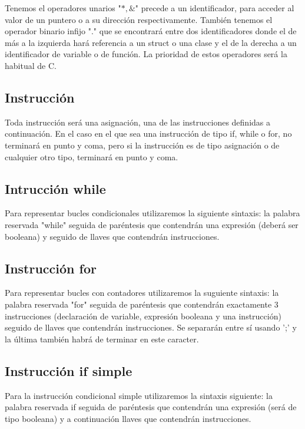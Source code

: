 \documentclass{article}
\begin{document}
Tenemos el operadores unarios "$*,\&$" precede a un identificador, para acceder al valor de un puntero o a su dirección respectivamente.
También tenemos el operador binario infijo "." que se encontrará entre dos identificadores donde el de más a la izquierda hará referencia a un struct o una clase y el de la derecha a un identificador de variable o de función. La prioridad de estos operadores será la habitual de C.


\subsection{Instrucción}
Toda instrucción será una asignación, una de las instrucciones definidas a continuación. En el caso en el que sea una instrucción de tipo if, while o for, no terminará en punto y coma, pero si la instrucción es de tipo asignación o de cualquier otro tipo, terminará en punto y coma.


\subsection{Intrucción while}

Para representar bucles condicionales utilizaremos la siguiente sintaxis: la palabra reservada "while" seguida de paréntesis que contendrán una expresión (deberá ser booleana) y seguido de llaves que contendrán instrucciones.

\subsection{Instrucción for}

Para representar bucles con contadores utilizaremos la suguiente sintaxis: la palabra reservada "for" seguida de paréntesis que contendrán exactamente 3 instrucciones (declaración de variable, expresión booleana y una instrucción) seguido de llaves que contendrán instrucciones. Se separarán entre sí usando ';' y la última también habrá de terminar en este caracter.

\subsection{Instrucción if simple}

Para la instrucción condicional simple utilizaremos la sintaxis siguiente: la palabra reservada if seguida de paréntesis que contendrán una expresión (será de tipo booleana) y a continuación llaves que contendrán instrucciones.
\end{document}
